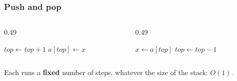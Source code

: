 \documentclass[aspectratio=169,10pt,compress]{beamer}
\begin{document}
\begin{frame}[t,fragile] \frametitle{Push and pop}
  \begin{columns}[T]
    \begin{column}{0.49\textwidth}
      \SetAlFnt{\small}


\begin{algorithm}[H]
  \caption{Push}
  $top \gets top + 1$\;
  $a[top] \gets x$\;
\end{algorithm}

    \end{column}
    \begin{column}{0.49\textwidth}
      \SetAlFnt{\small}


\begin{algorithm}[H]
  \caption{Pop}
  $x \gets a[top]$\;
  $top \gets top - 1$\;
  \;
\end{algorithm}

    \end{column}
  \end{columns}
  \small Each runs a \textbf{fixed} number of steps, whatever the size of the stack: $O(1)$.
\end{frame}
\end{document}
